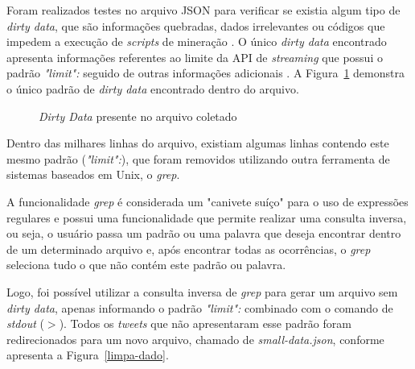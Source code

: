Foram realizados testes no arquivo JSON para verificar se existia algum tipo de \textit{dirty data}, que são informações quebradas, dados irrelevantes ou códigos que impedem a execução de \textit{scripts} de mineração \cite{dirty-data}. O único \textit{dirty data} encontrado apresenta informações referentes ao limite da API de \textit{streaming} que possui o padrão \textit{"limit":} seguido de outras informações adicionais \cite{twitter-doc}. A Figura~\ref{fig-dirty} demonstra o único padrão de \textit{dirty data} encontrado dentro do arquivo.

\begin{figure}[h]
	\centering
	\vspace{0.1cm}
	\caption{\textit{Dirty Data} presente no arquivo coletado}
	\label{fig-dirty}
\end{figure}

Dentro das milhares linhas do arquivo, existiam algumas linhas contendo este mesmo padrão (\textit{"limit":}), que foram removidos utilizando outra ferramenta de sistemas baseados em Unix, o \textit{grep}.

A funcionalidade \textit{grep} é considerada um "canivete suíço" \space para o uso de expressões regulares e possui uma funcionalidade que permite realizar uma consulta inversa, ou seja, o usuário passa um padrão ou uma palavra que deseja encontrar dentro de um determinado arquivo e, após encontrar todas as ocorrências, o \textit{grep} seleciona tudo o que não contém este padrão ou palavra.

Logo, foi possível utilizar a consulta inversa de \textit{grep} para gerar um arquivo sem \textit{dirty data}, apenas informando o padrão \textit{"limit":} combinado com o comando de \textit{stdout} ($>$). Todos os \textit{tweets} que não apresentaram esse padrão foram redirecionados para um novo arquivo, chamado de \textit{small-data.json}, conforme apresenta a Figura~\ref{limpa-dado}.

